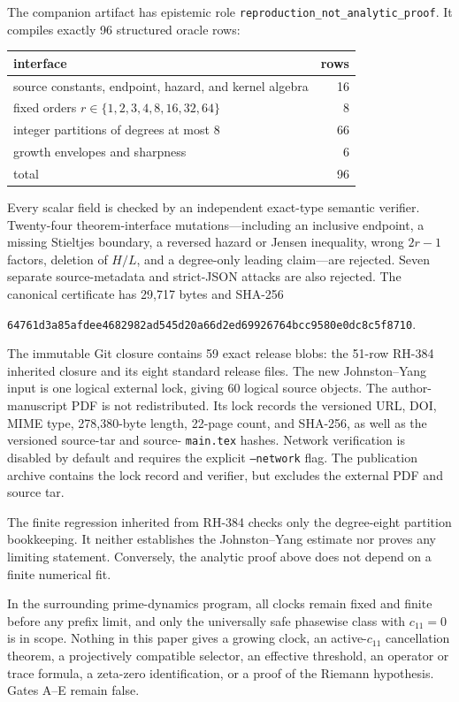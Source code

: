 \documentclass[11pt]{article}
\theoremstyle{definition}
\theoremstyle{remark}
\begin{document}
The companion artifact has epistemic role
\texttt{reproduction\_not\_analytic\_proof}.  It compiles exactly 96
structured oracle rows:
\begin{center}
\begin{tabular}{@{}lr@{}}
\toprule
interface & rows\\
\midrule
source constants, endpoint, hazard, and kernel algebra & 16\\
fixed orders $r\in\{1,2,3,4,8,16,32,64\}$ & 8\\
integer partitions of degrees at most $8$ & 66\\
growth envelopes and sharpness & 6\\
\midrule
total & 96\\
\bottomrule
\end{tabular}
\end{center}
Every scalar field is checked by an independent exact-type semantic
verifier.  Twenty-four theorem-interface mutations---including an
inclusive endpoint, a missing Stieltjes boundary, a reversed hazard or
Jensen inequality, wrong $2r-1$ factors, deletion of $H/L$, and a
degree-only leading claim---are rejected.  Seven separate source-metadata
and strict-JSON attacks are also rejected.  The canonical certificate has
29,717 bytes and SHA-256
\begin{center}
\small\texttt{64761d3a85afdee4682982ad545d20a66d2ed69926764bcc9580e0dc8c5f8710}.
\end{center}

The immutable Git closure contains 59 exact release blobs: the 51-row
RH-384 inherited closure and its eight standard release files.  The new
Johnston--Yang input is one logical external lock, giving 60 logical source
objects.  The author-manuscript PDF is not redistributed.  Its lock records
the versioned URL, DOI, MIME type, 278,380-byte length, 22-page count, and
SHA-256, as well as the versioned source-tar and source-
\texttt{main.tex} hashes.  Network verification is disabled by default and
requires the explicit \texttt{--network} flag.  The publication archive
contains the lock record and verifier, but excludes the external PDF and
source tar.

The finite regression inherited from RH-384 checks only the degree-eight
partition bookkeeping.  It neither establishes the Johnston--Yang
estimate nor proves any limiting statement.  Conversely, the analytic
proof above does not depend on a finite numerical fit.

In the surrounding prime-dynamics program, all clocks remain fixed and
finite before any prefix limit, and only the universally safe phasewise
class with $c_{11}=0$ is in scope.  Nothing in this paper gives a growing
clock, an active-$c_{11}$ cancellation theorem, a projectively compatible
selector, an effective threshold, an operator or trace formula, a zeta-zero
identification, or a proof of the Riemann hypothesis.  Gates A--E remain
false.
\end{document}

